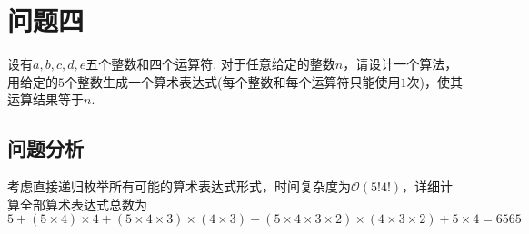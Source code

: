 \documentclass[12pt, a4paper, oneside]{ctexart}
\numberwithin{equation}{section}  %
\def\O{\mathcal{O}}          %
\begin{document}
\section{问题四}
设有$a,b,c,d,e$五个整数和\cppinline{+,-,*,/}四个运算符. 对于任意给定的整数$n$，请设计一个算法，用给定的$5$个整数生成一个算术表达式(每个整数和每个运算符只能使用$1$次)，使其运算结果等于$n$.
\subsection{问题分析}
考虑直接递归枚举所有可能的算术表达式形式，时间复杂度为$\O(5!4!)$，详细计算全部算术表达式总数为
\begin{equation*}
    5+(5\times 4)\times 4 + (5\times 4\times 3)\times(4\times 3) + (5\times 4\times 3\times 2)\times (4\times 3\times 2)+5\!\times 4\! = 6565
\end{equation*}
\end{document}
